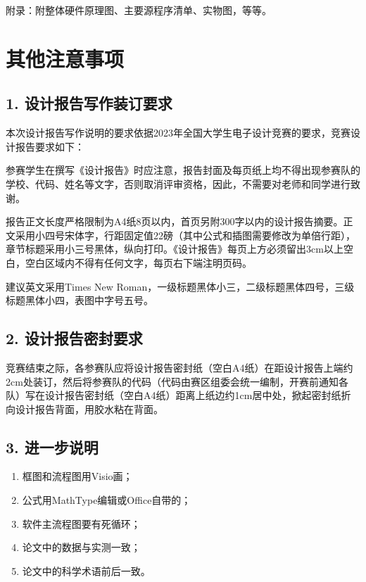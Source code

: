 \documentclass[zihao=-4,fontset=none]{ctexart}
\begin{document}
附录：附整体硬件原理图、主要源程序清单、实物图，等等。

\section*{其他注意事项}

\subsection*{1. 设计报告写作装订要求}

本次设计报告写作说明的要求依据2023年全国大学生电子设计竞赛的要求，竞赛设计报告要求如下：

参赛学生在撰写《设计报告》时应注意，报告封面及每页纸上均不得出现参赛队的学校、代码、姓名等文字，否则取消评审资格，因此，不需要对老师和同学进行致谢。

报告正文长度严格限制为A4纸8页以内，首页另附300字以内的设计报告摘要。正文采用小四号宋体字，行距固定值22磅（其中公式和插图需要修改为单倍行距），章节标题采用小三号黑体，纵向打印。《设计报告》每页上方必须留出3cm以上空白，空白区域内不得有任何文字，每页右下端注明页码。

建议英文采用Times New Roman，一级标题黑体小三，二级标题黑体四号，三级标题黑体小四，表图中字号五号。

\subsection*{2. 设计报告密封要求}

竞赛结束之际，各参赛队应将设计报告密封纸（空白A4纸）在距设计报告上端约2cm处装订，然后将参赛队的代码（代码由赛区组委会统一编制，开赛前通知各队）写在设计报告密封纸（空白A4纸）距离上纸边约1cm居中处，掀起密封纸折向设计报告背面，用胶水粘在背面。

\subsection*{3. 进一步说明}

\begin{enumerate}
    \item 框图和流程图用Visio画；
    \item 公式用MathType编辑或Office自带的；
    \item 软件主流程图要有死循环；
    \item 论文中的数据与实测一致；
    \item 论文中的科学术语前后一致。
\end{enumerate}
\end{document}
